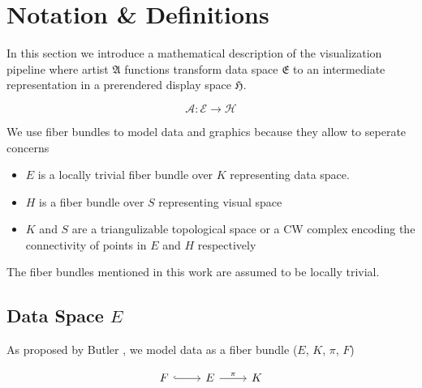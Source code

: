 \documentclass[../main.tex]{subfiles}
\begin{document}
\section{Notation \& Definitions}

 
In this section we introduce a mathematical description of the visualization pipeline where artist $\mathfrak{A}$ functions transform data space $\mathfrak{E}$ to an intermediate representation in a prerendered display space $\mathfrak{H}$. 

\begin{equation}
    \label{eq:artist}
    \mathcal{A}: \mathcal{E} \rightarrow \mathcal{H}
\end{equation}

We use fiber bundles\cite{FiberBundle2020, rowlandFiberBundle} to model data and graphics because they allow to seperate concerns 

\begin{itemize}
\item $E$ is a locally trivial fiber bundle over $K$ representing data space.
\item $H$ is a fiber bundle over $S$ representing visual space
\item $K$ and $S$ are a triangulizable topological space or a CW complex encoding the connectivity of points in $E$ and $H$ respectively
\end{itemize}

The fiber bundles mentioned in this work are assumed to be locally trivial\cite{spanier1989algebraic,LocallyTrivialFibre}.

\subsection{Data Space $E$}
As proposed by Butler \cite{butlerVectorBundleClassesForm1992,butlerVisualizationModelBased1989}, we model data as a fiber bundle ($E$, $K$, $\pi$, $F$)

\begin{equation}
    \label{eq:fiber_bundle}
    \begin{tikzcd}
        F \arrow[r, hook] & E \arrow[r, "\pi"] & K
    \end{tikzcd}
\end{equation}
\end{document}
